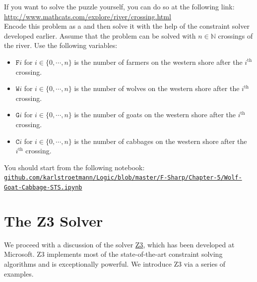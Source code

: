 If you want to solve the puzzle yourself, you can do so at the following link:
\\[0.2cm]
\hspace*{1.3cm}
\href{http://www.mathcats.com/explore/river/crossing.html}{http://www.mathcats.com/explore/river/crossing.html}
\\[0.2cm]
Encode this problem as a  and then solve it with the help
of the constraint solver developed earlier.  Assume that the
problem can be solved with $n\in\mathbb{N}$ crossings of the river.  Use the following
variables:
\begin{itemize}
\item $\texttt{F}i$ for $i\in\{0,\cdots,n\}$ is the number of farmers on the western shore after the 
      $i^{\textrm{th}}$ crossing.
\item $\texttt{W}i$ for $i\in\{0,\cdots,n\}$ is the number of wolves on the western shore after the 
      $i^{\textrm{th}}$ crossing.
\item $\texttt{G}i$ for $i\in\{0,\cdots,n\}$ is the number of goats on the western shore after the 
      $i^{\textrm{th}}$ crossing.
\item $\texttt{C}i$ for $i\in\{0,\cdots,n\}$ is the number of cabbages on the western shore after the 
      $i^{\textrm{th}}$ crossing.
\end{itemize}
You should start from the following notebook:
\\[0.2cm]
\href{https://github.com/karlstroetmann/Logic/blob/master/F-Sharp/Chapter-5/Wolf-Goat-Cabbage-STS.ipynb}{\small\texttt{github.com/karlstroetmann/Logic/blob/master/F-Sharp/Chapter-5/Wolf-Goat-Cabbage-STS.ipynb}}
\eox

\section{The Z3 Solver}
We proceed with a discussion of the solver
\href{https://www.microsoft.com/en-us/research/project/z3-3/}{Z3}, which has been developed
at Microsoft.  Z3 implements most of the state-of-the-art constraint solving algorithms
and is exceptionally powerful.  We introduce Z3 via a series of examples.

